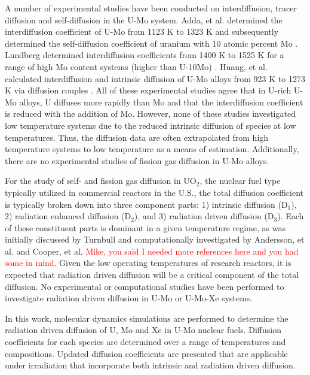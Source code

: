 \documentclass[review]{elsarticle}
\begin{document}
A number of experimental studies have been conducted on interdiffusion, tracer diffusion and self-diffusion in the U-Mo system. Adda, et al. determined the interdiffusion coefficient of U-Mo from 1123 K to 1323 K \cite{adda1958} and subsequently determined the self-diffusion coefficient of uranium with 10 atomic percent Mo \cite{adda1962}.  Lundberg determined interdiffusion coefficients from 1400 K to 1525 K for a range of high Mo content systems (higher than U-10Mo) \cite{lundberg1989}. Huang, et al. calculated interdiffusion and intrinsic diffusion of U-Mo alloys from 923 K to 1273 K via diffusion couples \cite{huang2013}. All of these experimental studies agree that in U-rich U-Mo alloys, U diffuses more rapidly than Mo and that the interdiffusion coefficient is reduced with the addition of Mo. However, none of these studies investigated low temperature systems due to the reduced intrinsic diffusion of species at low temperatures. Thus, the diffusion data are often extrapolated from high temperature systems to low temperature as a means of estimation. Additionally, there are no experimental studies of fission gas diffusion in U-Mo alloys. 

For the study of self- and fission gas diffusion in UO$_2$, the nuclear fuel type typically utilized in commercial reactors in the U.S., the total diffusion coefficient is typically broken down into three component parts: 1) intrinsic diffusion (D$_1$), 2) radiation enhanced diffusion (D$_2$), and 3) radiation driven diffusion (D$_3$). Each of these constituent parts is dominant in a given temperature regime, as was initially discussed by Turnbull \cite{turnbull1982} and computationally investigated by Andersson, et al. \cite{andersson2014} and Cooper, et al. \cite{cooper2016} \textcolor{red}{Mike, you said I needed more references here and you had some in mind}. Given the low operating temperatures of research reactors, it is expected that radiation driven diffusion will be a critical component of the total diffusion. No experimental or computational studies have been performed to investigate radiation driven diffusion in U-Mo or U-Mo-Xe systems.

In this work, molecular dynamics simulations are performed to determine the radiation driven diffusion of U, Mo and Xe in U-Mo nuclear fuels. Diffusion coefficients for each species are determined over a range of temperatures and compositions. Updated diffusion coefficients are presented that are applicable under irradiation that incorporate both intrinsic and radiation driven diffusion. 
\end{document}
